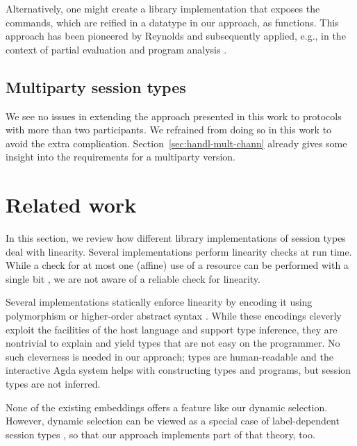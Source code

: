 \documentclass[acmsmall,screen,anonymous,review]{acmart}
\begin{document}
Alternatively, one might create a library implementation that exposes
the commands, which are reified in a datatype in our approach, as
functions. This approach has been pioneered by Reynolds \cite{Reynolds1994} and
subsequently applied, e.g., in the context of partial evaluation and
program analysis \cite{DBLP:journals/jfp/Thiemann99,DBLP:journals/jfp/CaretteKS09}.

\subsection{Multiparty session types}
\label{sec:mult-sess-types}

We see no issues in extending the approach presented in this work to
protocols with more than two participants. We refrained from doing so
in this work to avoid the extra
complication. Section~\ref{sec:handl-mult-chann} already gives some
insight into the requirements for a multiparty version.

\section{Related work}
\label{sec:related-work}

In this section, we review how different library implementations of
session types deal with linearity. Several implementations perform
linearity checks at run time. While a check for at most one (affine)
use of a resource can be performed with a single bit \cite{DBLP:conf/esop/TovP10}, we
are not aware of a reliable check for linearity.

Several implementations statically enforce linearity by encoding it
using polymorphism \cite{DBLP:journals/scp/ImaiYY19} or higher-order
abstract syntax \cite{DBLP:conf/haskell/LindleyM16}. While these
encodings cleverly exploit the facilities of the host language and
support type inference, they
are nontrivial to explain and yield types that are not easy on the
programmer. No such cleverness is needed in our approach; types are
human-readable and the interactive Agda system helps with constructing
types and programs, but session types are not inferred.

None of the existing embeddings offers a feature like our dynamic
selection. However, dynamic selection can be viewed as a special case
of label-dependent session types
\cite{DBLP:journals/pacmpl/ThiemannV20}, so that our  approach
implements part of that theory, too.

\end{document}
